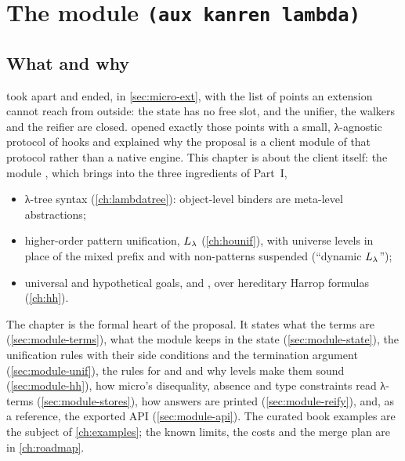\chapter{The module \texorpdfstring{\texttt{(aux kanren lambda)}}{(aux kanren lambda)}}\label{ch:module}

\section*{What and why}

 took \micro{} apart and ended, in \cref{sec:micro-ext}, with the list of points an extension
cannot reach from outside: the state has no free slot, and the unifier, the walkers and the reifier are closed.
 opened exactly those points with a small, λ-agnostic protocol of hooks and explained why the
proposal is a client module of that protocol rather than a native engine. This chapter is about the client
itself: the module , which brings into \micro{} the three ingredients of Part~I,
\begin{itemize}
  \item λ-tree syntax (\cref{ch:lambdatree}): object-level binders are meta-level abstractions;
  \item higher-order pattern unification, $L_\lambda$ (\cref{ch:hounif}), with universe levels in place of the
        mixed prefix and with non-patterns suspended (\enquote{dynamic $L_\lambda$});
  \item universal and hypothetical goals,  and , over hereditary Harrop formulas (\cref{ch:hh}).
\end{itemize}

The chapter is the formal heart of the proposal. It states what the terms are (\cref{sec:module-terms}),
what the module keeps in the state (\cref{sec:module-state}), the unification rules with their side
conditions and the termination argument (\cref{sec:module-unif}), the rules for  and  and
why levels make them sound (\cref{sec:module-hh}), how micro's disequality, absence and type constraints
read λ-terms (\cref{sec:module-stores}), how answers are printed (\cref{sec:module-reify}), and, as a
reference, the exported API (\cref{sec:module-api}). The curated book examples are the subject of
\cref{ch:examples}; the known limits, the costs and the merge plan are in \cref{ch:roadmap}.

